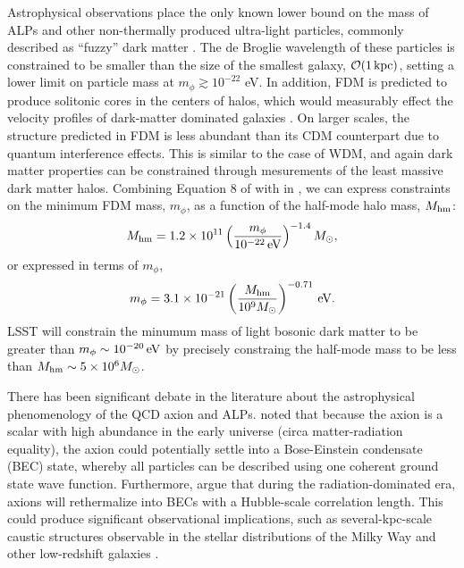 Astrophysical observations place the only known lower bound on the mass of ALPs and other non-thermally produced ultra-light particles, commonly described as ``fuzzy'' dark matter \citep[FDM; \eg,][]{Hu:2000,Hui:2017}. 
The de Broglie wavelength of these particles is constrained to be smaller than the size of the smallest galaxy, $\mathcal{O}(1\mathrm{\,kpc})$, setting a lower limit on particle mass at $m_\phi \gtrsim 10^{-22}$ eV. 
In addition, FDM is predicted to produce solitonic cores in the centers of halos, which would measurably effect the velocity profiles of dark-matter dominated galaxies \citep{Robles:2012uy,Robles:2018fur,Schive:2014hza,Du:2016aik}. 
On larger scales, the structure predicted in FDM is less abundant than its CDM counterpart due to quantum interference effects.
This is similar to the case of WDM, and again dark matter properties can be constrained through mesurements of the least massive dark matter halos.
Combining Equation 8 of \citet[][]{1703.09126} with  in , we can express constraints on the minimum FDM mass, $m_\phi$, as a function of the half-mode halo mass, $M_{\rm hm}$:
\begin{equation}
M_{\rm hm} = 1.2 \times 10^{11} \left( \frac{m_\phi}{10^{-22}\mathrm{\,eV}} \right)^{-1.4} M_\odot,
\end{equation}
or expressed in terms of $m_\phi$, 
\begin{equation}
m_\phi = 3.1 \times 10^{-21} \left( \frac{M_{\rm hm}}{10^{9}M_\odot} \right)^{-0.71} \mathrm{\,eV}.
\end{equation}
LSST will constrain the minumum mass of light bosonic dark matter to be greater than $m_\phi \sim 10^{-20} \mathrm{\,eV}$ by precisely constraing the half-mode mass to be less than $M_{\rm hm} \sim 5 \times 10^{6} M_\odot$.


There has been significant debate in the literature about the astrophysical phenomenology of the QCD axion and ALPs.
\citet{Sikivie:2009} noted that because the axion is a scalar with high abundance in the early universe (circa matter-radiation equality), the axion could potentially settle into a Bose-Einstein condensate (BEC) state, whereby all particles can be described using one coherent ground state wave function. 
Furthermore, \citet{Sikivie:2009} argue that during the radiation-dominated era, axions will rethermalize into BECs with a Hubble-scale correlation length.
This could produce significant observational implications, such as several-kpc-scale caustic structures observable in the stellar distributions of the Milky Way and other low-redshift galaxies \citep[\eg,][]{Natarajan:2006,0805.4556,Rindler-Daller:2013zxa}.

